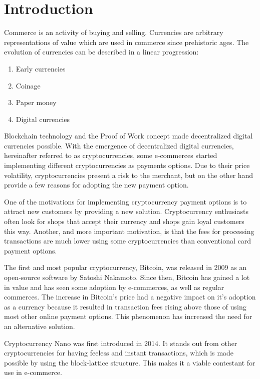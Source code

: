\documentclass{ferseminar}
\begin{document}
\stvoripredstranice
\section{Introduction}
Commerce is an activity of buying and selling. Currencies are arbitrary representations of value which are used in commerce since prehistoric ages. The evolution of currencies can be described in a linear progression:

\begin{enumerate}
	\item Early currencies
	\item Coinage
	\item Paper money
	\item Digital currencies
\end{enumerate}

Blockchain technology and the Proof of Work concept made decentralized digital currencies possible. With the emergence of decentralized digital currencies, hereinafter referred to as cryptocurrencies, some e-commerces started implementing different cryptocurrencies as payments options. Due to their price volatility, cryptocurrencies present a risk to the merchant, but on the other hand provide a few reasons for adopting the new payment option.

One of the motivations for implementing cryptocurrency payment options is to attract new customers by providing a new solution. Cryptocurrency enthusiasts often look for shops that accept their currency and shops gain loyal customers this way. Another, and more important motivation, is that the fees for processing transactions are much lower using some cryptocurrencies than conventional card payment options.

The first and most popular cryptocurrency, Bitcoin, was released in 2009 as an open-source software by Satoshi Nakamoto. Since then, Bitcoin has gained a lot in value and has seen some adoption by e-commerces, as well as regular commerces. The increase in Bitcoin's price had a negative impact on it's adoption as a currency because it resulted in transaction fees rising above those of using most other online payment options. This phenomenon has increased the need for an alternative solution.

Cryptocurrency Nano was first introduced in 2014. It stands out from other cryptocurrencies for having feeless and instant transactions, which is made possible by using the block-lattice structure. This makes it a viable contestant for use in e-commerce.
\end{document}
